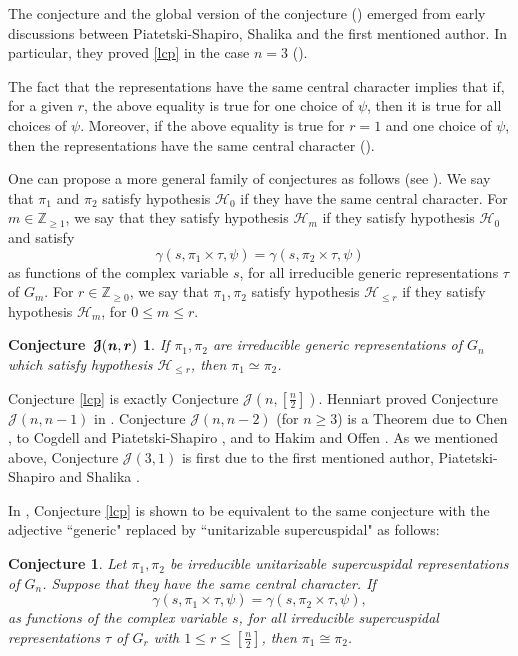 \documentclass[12pt]{amsart}
\newtheorem {conj}[thm]{Conjecture}
\newtheorem*{Jconj}{Conjecture~${{\boldsymbol{{\mathcal {J}}}}}(\textbf{\textit{n}},{{\boldsymbol{r}}})$}
\begin{document}
The conjecture and the global version of the conjecture (\cite[Section 8, Conjecture 1]{CPS99}) emerged from early discussions between Piatetski-Shapiro, Shalika and the first mentioned author. In particular, they proved \ref{lcp} in the case $n=3$ (\cite{JPSS79}).

The fact that the representations have the same central character implies that if, for a given $r$, the above equality is true for one choice of  $\psi$, then it is true for all choices of $\psi$. Moreover, if the above equality is true for $r = 1$ and one choice of $\psi$, then the representations have the same central character (\cite[Corollary 2.7]{JNS15}).

One can propose a more general family of conjectures as follows (see \cite{ALSX15}).
We say that $\pi_1$ and $\pi_2$ satisfy hypothesis ${{\mathcal {H}}}_0$
if they have the same central character. 
For $m \in {{\mathbb {Z}}}_{\geq 1}$, we say that they satisfy hypothesis ${{\mathcal {H}}}_m$ if they satisfy hypothesis ${{\mathcal {H}}}_0$ and satisfy
$${{\gamma}}(s,\pi_1\times\tau,\psi)={{\gamma}}(s,\pi_2\times\tau,\psi)$$
as functions
of the complex variable $s$, for all irreducible generic
representations $\tau$ of $G_m$.
For $r \in {{\mathbb {Z}}}_{\geq 0}$, we say that $\pi_1,\pi_2$ satisfy hypothesis ${{\mathcal {H}}}_{\le r}$ if they satisfy hypothesis ${{\mathcal {H}}}_m$,
for $0\le m\le r$.

\begin{Jconj}
If $\pi_1,\pi_2$ are irreducible generic representations
of $G_n$ which satisfy hypothesis ${{\mathcal {H}}}_{\le r}$, then $\pi_1\simeq\pi_2$.
\end{Jconj}

Conjecture \ref{lcp} is exactly Conjecture ${{\mathcal {J}}}(n,[\frac{n}{2}])$. Henniart proved Conjecture ${{\mathcal {J}}}(n,n-1)$ in \cite{H93}.  Conjecture ${{\mathcal {J}}}(n,n-2)$ (for $n \geq 3$) is a Theorem due
to Chen \cite{Ch96, Ch06}, to Cogdell and Piatetski-Shapiro \cite{CPS99}, and to Hakim and Offen \cite{HO15}. As we mentioned above, Conjecture ${{\mathcal {J}}}(3,1)$ is first due to the first mentioned author, Piatetski-Shapiro and Shalika \cite{JPSS79}.

In \cite[Section 2.4]{JNS15}, Conjecture \ref{lcp} is shown to be equivalent to the same conjecture with the adjective ``generic" replaced by ``unitarizable supercuspidal" as follows: 

\begin{conj}\label{lcp2}
Let $\pi_1,\pi_2$ be irreducible unitarizable supercuspidal representations of $G_n$. Suppose that they have the same central character. If
\[
\gamma(s, \pi_1 \times \tau, \psi) = \gamma(s, \pi_2 \times \tau, \psi),
\]
as functions of the complex variable $s$, for all irreducible
supercuspidal representations $\tau$ of $G_r$ with $1 \leq r \leq 
[\frac{n}{2}]$, then $\pi_1 \cong \pi_2$.
\end{conj}
\end{document}
